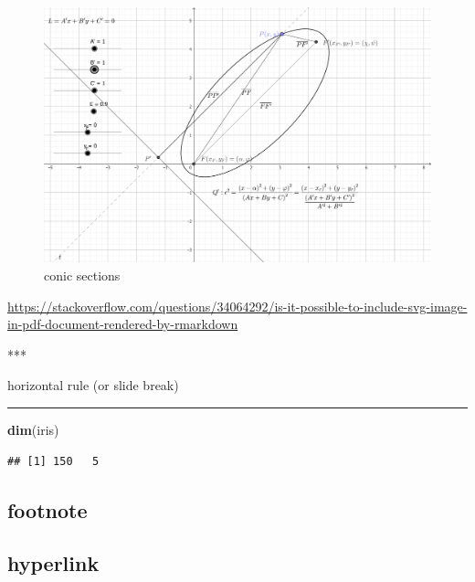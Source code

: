 \documentclass[
]{book}
\newenvironment{Shaded}{\begin{snugshade}}{\end{snugshade}}
\newcommand{\FunctionTok}[1]{\textcolor[rgb]{0.13,0.29,0.53}{\textbf{#1}}}
\newcommand{\NormalTok}[1]{#1}
\theoremstyle{definition}
\theoremstyle{definition}
\theoremstyle{definition}
\theoremstyle{definition}
\theoremstyle{remark}
\begin{document}
\begin{figure}
\includegraphics[width=0.75\linewidth]{img/conic-sections} \caption{conic sections}\label{fig:unnamed-chunk-23}
\end{figure}

\url{https://stackoverflow.com/questions/34064292/is-it-possible-to-include-svg-image-in-pdf-document-rendered-by-rmarkdown}

\begin{Shaded}
\begin{Highlighting}[]
\NormalTok{***}
\end{Highlighting}
\end{Shaded}

horizontal rule (or slide break)

\begin{center}\rule{0.5\linewidth}{0.5pt}\end{center}

\begin{Shaded}
\begin{Highlighting}[]
\FunctionTok{dim}\NormalTok{(iris) }
\end{Highlighting}
\end{Shaded}

\begin{verbatim}
## [1] 150   5
\end{verbatim}

\hypertarget{footnote}{%
\subsection{footnote}\label{footnote}}

\hypertarget{hyperlink}{%
\subsection{hyperlink}\label{hyperlink}}
\end{document}
